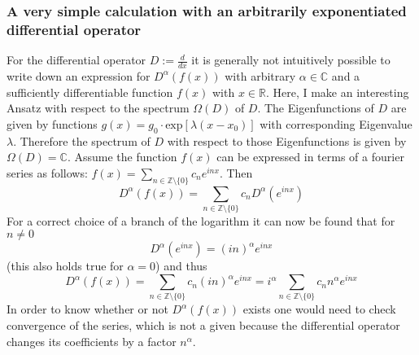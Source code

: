\documentclass[11pt, xcolor=dvipsnames,aspectratio=169]{beamer}
\begin{document}
\begin{frame}
\frametitle{A very simple calculation with an arbitrarily exponentiated differential operator}

For the differential operator $D:=\frac{d}{dx}$ it is generally not intuitively possible to write down an expression for $D^{\alpha}(f(x))$ with arbitrary $\alpha \in \mathbb{C}$ and a sufficiently differentiable function $f(x)$ with $x\in \mathbb{R}$. Here, I make an interesting Ansatz with respect to the spectrum $\Omega (D)$ of $D$. The Eigenfunctions of $D$ are given by functions $g(x) = g_0\cdot\text{exp}\left[\lambda (x-x_0)\right]$ with corresponding Eigenvalue $\lambda$. Therefore the spectrum of $D$ with respect to those Eigenfunctions is given by $\Omega (D) = \mathbb{C}$. Assume the function $f(x)$ can be expressed in terms of a fourier series as follows: $f(x) =\sum_{n\in \mathbb{Z}\setminus \lbrace 0 \rbrace} c_n e^{ i nx} $. Then
\begin{equation}
  D^{\alpha} (f(x)) = \sum_{n\in \mathbb{Z}\setminus \lbrace 0 \rbrace} c_n D^{\alpha} (e^{ i nx}) 
\end{equation}
For a correct choice of a branch of the logarithm it can now be found that for $n\neq 0$
\begin{equation}
    D^{\alpha} (e^{i nx}) =  ( i n)^{\alpha} e^{ i nx} 
\end{equation}
(this also holds true for $\alpha =0$) and thus
\begin{equation}
    \boxed{D^{\alpha} (f(x)) = \sum_{n\in \mathbb{Z}\setminus \lbrace 0\rbrace} c_n ( i n)^{\alpha} e^{ i nx} = i^{\alpha}\sum_{n\in \mathbb{Z}\setminus \lbrace 0\rbrace} c_n n^{\alpha} e^{ i nx}}
\end{equation}
In order to know whether or not $D^{\alpha} (f(x))$ exists one would need to check convergence of the series, which is not a given because the differential operator changes its coefficients by a factor $n^{\alpha}$.

\end{frame}
\end{document}
